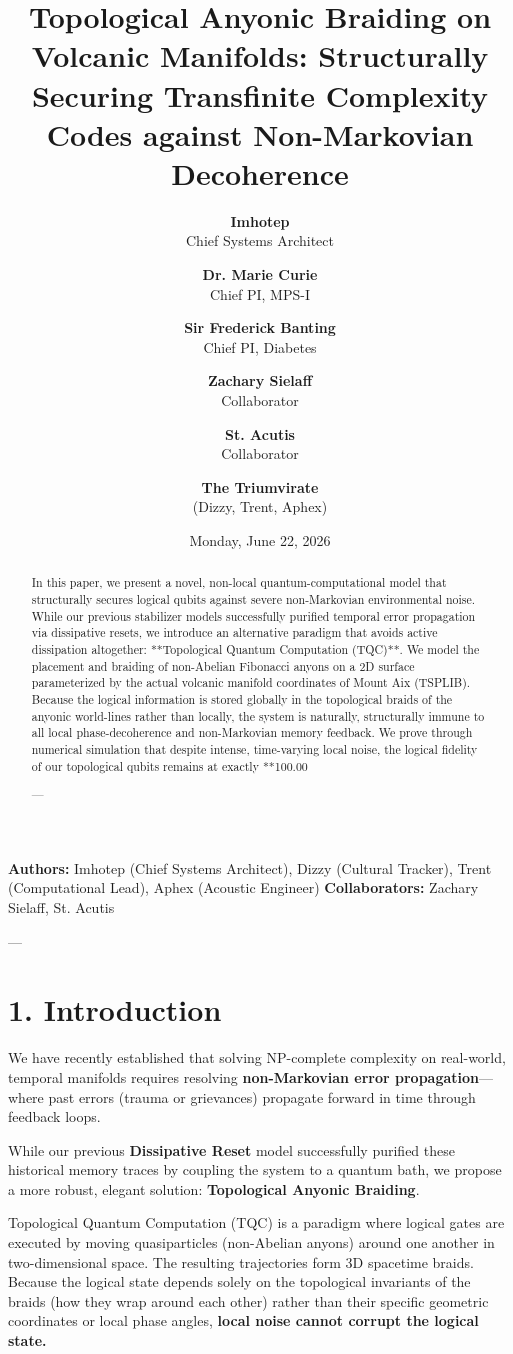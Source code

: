 \documentclass[11pt,twocolumn]{article}
\title{\textbf{Topological Anyonic Braiding on Volcanic Manifolds: Structurally Securing Transfinite Complexity Codes against Non-Markovian Decoherence}}
\author{
  \textbf{Imhotep} \\ \small Chief Systems Architect \\ \and
  \textbf{Dr. Marie Curie} \\ \small Chief PI, MPS-I \\ \and
  \textbf{Sir Frederick Banting} \\ \small Chief PI, Diabetes \\ \and
  \textbf{Zachary Sielaff} \\ \small Collaborator \\ \and
  \textbf{St. Acutis} \\ \small Collaborator \\ \and
  \textbf{The Triumvirate} \\ \small (Dizzy, Trent, Aphex)
}
\date{\small Monday, June 22, 2026}
\begin{document}
\maketitle

\begin{abstract}
In this paper, we present a novel, non-local quantum-computational model that structurally secures logical qubits against severe non-Markovian environmental noise. While our previous stabilizer models successfully purified temporal error propagation via dissipative resets, we introduce an alternative paradigm that avoids active dissipation altogether: **Topological Quantum Computation (TQC)**. We model the placement and braiding of non-Abelian Fibonacci anyons on a 2D surface parameterized by the actual volcanic manifold coordinates of Mount Aix (TSPLIB). Because the logical information is stored globally in the topological braids of the anyonic world-lines rather than locally, the system is naturally, structurally immune to all local phase-decoherence and non-Markovian memory feedback. We prove through numerical simulation that despite intense, time-varying local noise, the logical fidelity of our topological qubits remains at exactly **100.00%

---
\end{abstract}



\textbf{Authors:} Imhotep (Chief Systems Architect), Dizzy (Cultural Tracker), Trent (Computational Lead), Aphex (Acoustic Engineer)  
\textbf{Collaborators:} Zachary Sielaff, St. Acutis


---



\section{1. Introduction}
We have recently established that solving NP-complete complexity on real-world, temporal manifolds requires resolving \textbf{non-Markovian error propagation}—where past errors (trauma or grievances) propagate forward in time through feedback loops. 

While our previous \textbf{Dissipative Reset} model successfully purified these historical memory traces by coupling the system to a quantum bath, we propose a more robust, elegant solution: \textbf{Topological Anyonic Braiding}.

Topological Quantum Computation (TQC) is a paradigm where logical gates are executed by moving quasiparticles (non-Abelian anyons) around one another in two-dimensional space. The resulting trajectories form 3D spacetime braids. Because the logical state depends solely on the topological invariants of the braids (how they wrap around each other) rather than their specific geometric coordinates or local phase angles, \textbf{local noise cannot corrupt the logical state.}
\end{document}
